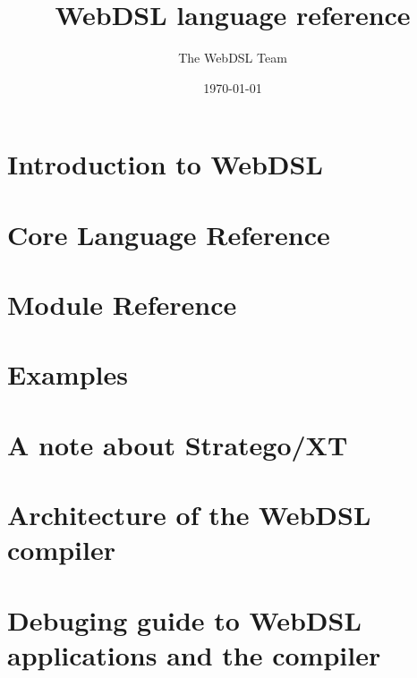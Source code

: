 \documentclass[10pt,a4paper]{memoir}
\title{WebDSL language reference}
\author{The WebDSL Team}
\date{\today}
\begin{document}
\frontmatter
\maketitle
\tableofcontents 
\mainmatter

\part{Introduction to WebDSL}


\part{Core Language Reference}


\part{Module Reference}



\backmatter
\appendix
\part{Examples}
\part{A note about Stratego/XT}

\part{Architecture of the WebDSL compiler}
\part{Debuging guide to WebDSL applications and the compiler}
\end{document}
